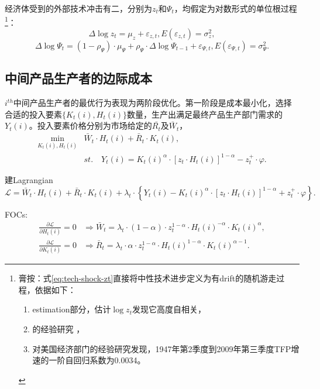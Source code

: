 经济体受到的外部技术冲击有二，分别为$z_t$和$\Psi_t$，均假定为对数形式的单位根过程\footnote{膏按：式\eqref{eq:tech-shock-zt}直接将中性技术进步定义为有drift的随机游走过程，依据如下：
  \begin{enumerate}
  \item estimation部分，\cite{Smets:2003ic}估计$\log z_t$发现它高度自相关，
  \item \cite{Prescott:1986ej}的经验研究 ，
  \item \cite{Fernald2009}对美国经济部门的经验研究发现，1947年第2季度到2009年第三季度TFP增速的一阶自回归系数为0.0034。
  \end{enumerate}
}：
\begin{equation}
  \label{eq:tech-shock-zt}
  \Delta \log z_t = \mu_z + \varepsilon_{z,t}, E(\varepsilon_{z,t}) = \sigma^2_{z},
\end{equation}
\begin{equation}
  \label{eq:tech-shock-Psi}
  \Delta \log \Psi_t = (1-\rho_{\Psi}) \cdot \mu_{\Psi} + \rho_{\Psi} \cdot \Delta \log \Psi_{t-1} + \varepsilon_{\Psi, t}, E(\varepsilon_{\Psi,t}) = \sigma^2_{\Psi}.
\end{equation}


\subsection{中间产品生产者的边际成本}
\label{seq:marg-cost-intm-producer}
$i^{th}$中间产品生产者的最优行为表现为两阶段优化。第一阶段是成本最小化，选择合适的投入要素$\{K_{t}(i), H_{t}(i)\}$数量，生产出满足最终产品生产部门需求的$Y_t(i)$。投入要素价格分别为市场给定的$\bar{R_t}$及$\bar{W}_t$，
\begin{align*}
  \min_{K_{t}(i), H_{t}(i)} &\bar{W}_t \cdot H_t(i) + \bar{R}_t \cdot K_{t}(i), \\
  & st. \quad  Y_t(i) = K_t(i)^{\alpha} \cdot \left[ z_t \cdot H_{t}(i) \right]^{1-\alpha}  -  z_t^+ \cdot \varphi.
\end{align*}

建Lagrangian
\begin{equation*}
  \mathcal{L} = \bar{W}_t \cdot H_t(i) + \bar{R}_t \cdot K_{t}(i) +\lambda_t \cdot \left\{Y_t(i) - K_t(i)^{\alpha} \cdot \left[ z_t \cdot H_{t}(i) \right]^{1-\alpha}  +  z_t^+ \cdot \varphi \right\}.
\end{equation*}

FOCs:
\begin{align}
  \label{eq:intm-marg-min-cost-FOC-H}
  \frac{\partial \mathcal{L}}{\partial H_{t}(i)} = 0 &\Rightarrow \bar{W}_t = \lambda_t \cdot (1-\alpha) \cdot z_t^{1-\alpha} \cdot H_{t}(i)^{-\alpha} \cdot K_{t}(i)^{\alpha},\\
  \label{eq:intm-marg-min-cost-FOC-K}
\frac{\partial \mathcal{L}}{\partial K_{t}(i)} = 0 &\Rightarrow \bar{R}_t = \lambda_t \cdot \alpha \cdot z_t^{1-\alpha} \cdot H_{t}(i)^{1-\alpha} \cdot K_{t}(i)^{\alpha-1}.
\end{align}

